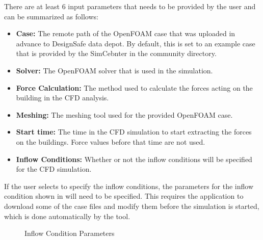 There are at least 6 input parameters that needs to be provided by the user and can be summarized as follows:
\begin{itemize}
    \item \textbf{Case:} The remote path of the OpenFOAM case that was uploaded in advance to DesignSafe data depot.
    By default, this is set to an example case that is provided by the SimCebnter in the community directory.  
    \item \textbf{Solver:} The OpenFOAM solver that is used in the simulation.
    \item \textbf{Force Calculation:} The method used to calculate the forces acting on the building in the CFD analysis.
    \item \textbf{Meshing:} The meshing tool used for the provided OpenFOAM case. 
    \item \textbf{Start time:} The time in the CFD simulation to start extracting the forces on the buildings.
        Force values before that time are not used.
    \item \textbf{Inflow Conditions:} Whether or not the inflow conditions will be specified for the CFD simulation.   
\end{itemize}

If the user selects to specify the inflow conditions, the parameters for the inflow condition shown in 
will need to be specified.
This requires the application to download some of the case files and modify them before the simulation is started,
which is done automatically by the tool.

\begin{figure}[!htbp]
    \caption{Inflow Condition Parameters}
    \label{fig:cfd_expert_inflow}
\end{figure}